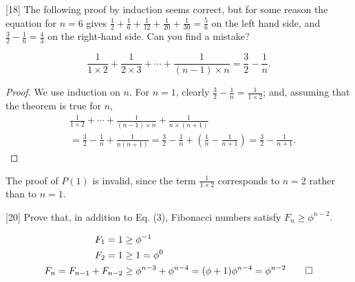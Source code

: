 \documentclass{amsart}
\begin{document}
\begin{problem}{[}18{]}
  The following proof by induction seems correct, but for some reason the
  equation for \(n = 6\) gives \(\frac{1}{2} + \frac{1}{6} + \frac{1}{12} +
  \frac{1}{20} + \frac{1}{30} = \frac{5}{6}\) on the left hand side, and
  \(\frac{3}{2} - \frac{1}{6} = \frac{4}{3}\) on the right-hand side. Can you
  find a mistake?
  \begin{theorem}
    \begin{equation*}
      \frac{1}{1 \times 2} + \frac{1}{2 \times 3} + \cdots +
        \frac{1}{(n-1) \times n} = \frac{3}{2} - \frac{1}{n}.
    \end{equation*}
  \end{theorem}
  \begin{proof}
    We use induction on \(n\). For \(n = 1\), clearly \(\frac{3}{2} -
      \frac{1}{n} = \frac{1}{1 \times 2}\); and, assuming that the theorem is
      true for \(n\),
    \begin{align*}
      &\frac{1}{1\times2} + \cdots + \frac{1}{(n - 1) \times n} +
        \frac{1}{n \times (n+1)} \\
      &= \frac{3}{2} - \frac{1}{n} + \frac{1}{n(n+1)} = \frac{3}{2} -
        \frac{1}{n} + \left(\frac{1}{n} - \frac{1}{n+1}\right) = \frac{3}{2} -
        \frac{1}{n+1}.
    \end{align*}
  \end{proof}
\end{problem}

\begin{solution}
  The proof of \(P(1)\) is invalid, since the term \(\frac{1}{1\times2}\)
  corresponds to \(n=2\) rather than to \(n=1\).
\end{solution}

\begin{problem}{[}20{]}
  Prove that, in addition to Eq. (3), Fibonacci numbers satisfy \(F_n \geq
  \phi^{n-2}\).
\end{problem}

\begin{solution}
  \begin{align*}
    F_1 = 1 &\geq \phi^{-1} \\
    F_2 = 1 &\geq 1 = \phi^0 \\
    F_n = F_{n-1} + F_{n-2} &\geq \phi^{n-3} + \phi^{n-4} = (\phi + 1)\phi^{n-4} = \phi^{n-2} \qed
  \end{align*}
\end{solution}
\end{document}
